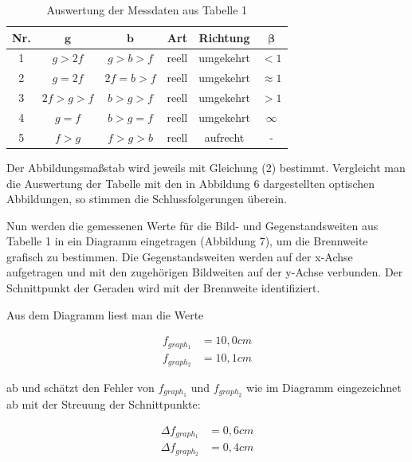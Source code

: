 \documentclass{article}
\begin{document}
\begin{table}[h]
\centering
\caption{Auswertung der Messdaten aus Tabelle 1}
\begin{tabular}{c|c|c|c|c|c}
\textbf{Nr.} & \textbf{$\bm{g}$} & \textbf{$\bm{b}$} & \textbf{Art} & \textbf{Richtung} & \textbf{$\bm{\beta}$} \\ \hline
    1 & $g > 2f$ & $g > b > f$ & reell & umgekehrt & $<1$ \\ \hline
    2 & $g = 2f$ & $2f = b > f$ & reell & umgekehrt & $\approx 1$ \\ \hline
    3 & $2f > g > f$ & $b > g > f$ & reell & umgekehrt & $>1$ \\ \hline
    4 & $g = f$ & $b > g = f$ & reell & umgekehrt & $\infty$ \\ \hline
    5 & $f > g$ & $f > g > b$ & reell & aufrecht & -
\end{tabular}
\end{table}

Der Abbildungsmaßstab wird jeweils mit Gleichung (2) bestimmt. Vergleicht man die Auswertung der Tabelle mit den in Abbildung 6 dargestellten optischen Abbildungen, so stimmen die Schlussfolgerungen überein.

Nun werden die gemessenen Werte für die Bild- und Gegenstandsweiten aus Tabelle 1 in ein Diagramm eingetragen (Abbildung 7), um die Brennweite grafisch zu bestimmen. Die Gegenstandsweiten werden auf der x-Achse aufgetragen und mit den zugehörigen Bildweiten auf der y-Achse verbunden. Der Schnittpunkt der Geraden wird mit der Brennweite identifiziert. 

Aus dem Diagramm liest man die Werte

\begin{equation}
    \begin{split}
        f_{graph_{1}} &= 10,0cm \\
        f_{graph_{2}} &= 10,1cm
    \end{split}
\end{equation}

ab und schätzt den Fehler von $f_{graph_{1}}$ und $f_{graph_{2}}$ wie im Diagramm eingezeichnet ab mit der Streuung der Schnittpunkte:

\begin{equation}
    \begin{split}
        \Delta f_{graph_{1}} &= 0,6cm \\
        \Delta f_{graph_{2}} &= 0,4cm
    \end{split}
\end{equation}
\end{document}
